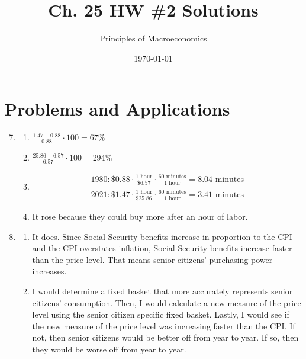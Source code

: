 \documentclass{article}
\title{Ch. 25 HW \#2 Solutions}
\author{Principles of Macroeconomics}
\date{\today}
\begin{document}
\maketitle

\section*{Problems and Applications}

\begin{enumerate}

\setcounter{enumi}{6}

\item

	\begin{enumerate}
	
	\item $\frac{1.47 - 0.88}{0.88} \cdot 100 = 67\%$
	
	\item $\frac{25.86 - 6.57}{6.57} \cdot 100 = 294\%$
	
	\item 
		\begin{gather*}
		1980: \$0.88 \cdot \frac{1 \text{ hour}}{\$6.57} \cdot \frac{60 \text{ minutes}}{1 \text{ hour}} = 8.04 \text{ minutes} \\
		2021: \$1.47 \cdot \frac{1 \text{ hour}}{\$25.86} \cdot \frac{60 \text{ minutes}}{1 \text{ hour}} = 3.41 \text{ minutes}
		\end{gather*}
		
	\item It rose because they could buy more after an hour of labor.
	
	\end{enumerate}
	
\item

	\begin{enumerate}
	
	\item It does. Since Social Security benefits increase in proportion to the CPI and the CPI overstates inflation, Social Security benefits increase faster than the price level. That means senior citizens' purchasing power increases.

	\item I would determine a fixed basket that more accurately represents senior citizens' consumption. Then, I would calculate a new measure of the price level using the senior citizen specific fixed basket. Lastly, I would see if the new measure of the price level was increasing faster than the CPI. If not, then senior citizens would be better off from year to year. If so, then they would be worse off from year to year. 
	

\end{enumerate}
\end{enumerate}
\end{document}
